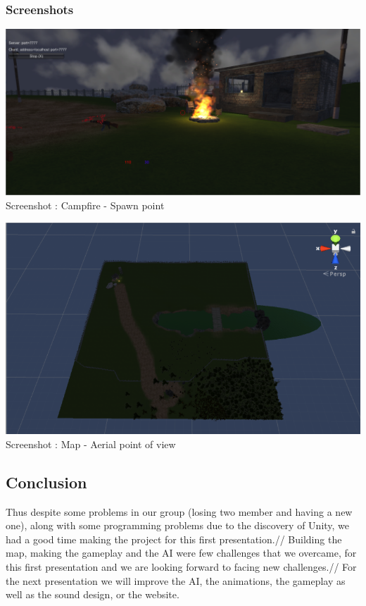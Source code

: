\documentclass[12pt]{article}
\begin{document}
	\subsubsection{Screenshots}
    
\begin{center}
	\bigskip

	\includegraphics[scale = 0.60]{Campfire.png}\\[1cm]
    Screenshot : Campfire - Spawn point
    
    \includegraphics[scale = 0.85]{Map.png}\\[1cm]
    Screenshot : Map - Aerial point of view

   
\end{center}

	
    \bigskip
    \bigskip
    
\subsection{Conclusion}

	Thus despite some problems in our group (losing two member and having a new one), along with some programming problems due to the discovery of Unity, we had a good time making the project for this first presentation.//
Building the map, making the gameplay and the AI were few challenges that we overcame, for this first presentation and we are looking forward to facing new challenges.//
For the next presentation we will improve the AI, the animations, the gameplay as well as the sound design, or the website.
\end{document}
